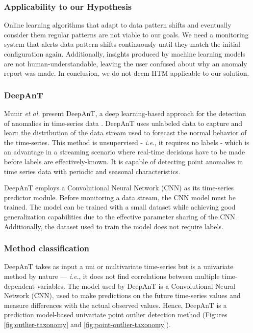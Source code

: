 \subsubsection*{Applicability to our Hypothesis}
Online learning algorithms that adapt to data pattern shifts and eventually consider them regular patterns are not viable to our goals. We need a monitoring system that alerts data pattern shifts continuously until they match the initial configuration again. Additionally, insights produced by machine learning models are not human-understandable, leaving the user confused about why an anomaly report was made. In conclusion, we do not deem HTM applicable to our solution.


\subsubsection{DeepAnT}
Munir \emph{et al.} present DeepAnT, a deep learning-based approach for the detection of anomalies in time-series data \cite{Munir-DeepAnT}. DeepAnT uses unlabeled data to capture and learn the distribution of the data stream used to forecast the normal behavior of the time-series. This method is unsupervised - \textit{i.e.}, it requires no labels - which is an advantage in a streaming scenario where real-time decisions have to be made before labels are effectively-known. It is capable of detecting point anomalies in time series data with periodic and seasonal characteristics.

DeepAnT employs a Convolutional Neural Network (CNN) as its time-series predictor module. Before monitoring a data stream, the CNN model must be trained. The model can be trained with a small dataset while achieving good generalization capabilities due to the effective parameter sharing of the CNN. Additionally, the dataset used to train the model does not require labels.

\subsubsection*{Method classification}
DeepAnT takes as input a uni or multivariate time-series but is a univariate method by nature --- \textit{i.e.}, it does not find correlations between multiple time-dependent variables. The model used by DeepAnT is a Convolutional Neural Network (CNN), used to make predictions on the future time-series values and measure differences with the actual observed values. Hence, DeepAnT is a prediction model-based univariate point outlier detection method (Figures \ref{fig:outlier-taxonomy} and \ref{fig:point-outlier-taxonomy}).

